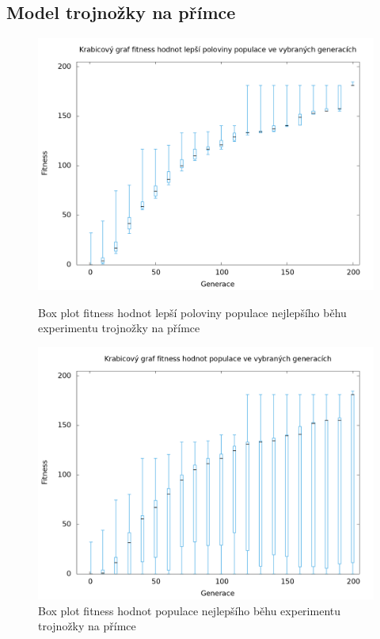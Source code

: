 \subsection{Model trojnožky na přímce}

\begin{figure}[h]
    \begin{minipage}[c]{0.48\linewidth}
        \includegraphics[width=\linewidth]{obrazky/bar_whisker_trojnozka_primka_top50.png}
        \caption{Box plot fitness hodnot lepší poloviny populace nejlepšího běhu experimentu trojnožky na přímce}
    \end{minipage}
    \hfill
    \begin{minipage}[c]{0.48\linewidth}
        \includegraphics[width=\linewidth]{obrazky/bar_whisker_trojnozka_primka.png}
        \caption{Box plot fitness hodnot populace nejlepšího běhu experimentu trojnožky na přímce}
    \end{minipage}
\end{figure}

